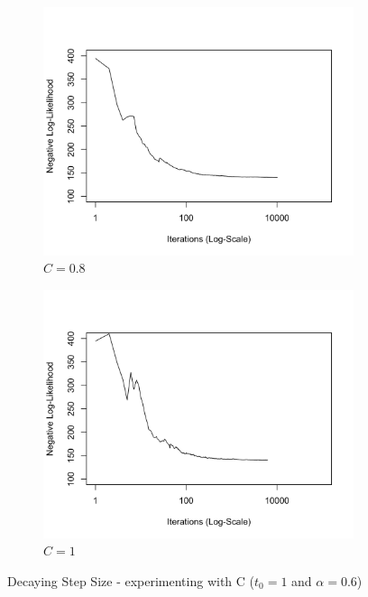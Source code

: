 \documentclass[11 pt]{article}
\begin{document}
\begin{enumerate}[label=(\Alph*)]
\begin{figure}[H]
\begin{center}
\begin{subfigure}[h]{0.45\linewidth}
				\includegraphics[width=\linewidth]{Fig/F2PD08.png}
				\caption{$C=0.8$}
			\end{subfigure}
			\begin{subfigure}[h]{0.45\linewidth}
				\includegraphics[width=\linewidth]{Fig/F2PD1.png}
				\caption{$C=1$}
			\end{subfigure}
			\caption{Decaying Step Size - experimenting with C ($t_0=1$ and $\alpha=0.6$)}
			\label{fig:Fig2}
		\end{center}
	\end{figure}


\end{enumerate}
\end{document}

